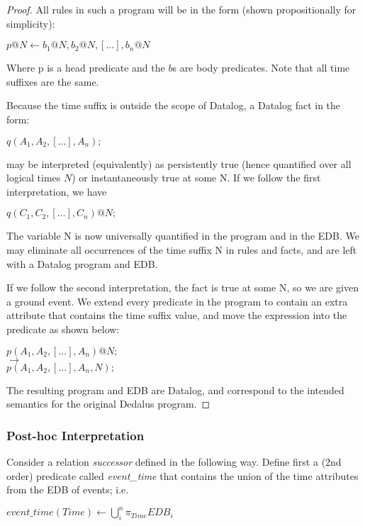 \begin{proof}
All rules in such a program will be in the form (shown propositionally for simplicity): 

$p@N \leftarrow b_{1}@N, b_{2}@N, [...], b_{n}@N$

Where p is a head predicate and the $b$s are body predicates.  Note that all time suffixes are 
the same.

Because the time suffix is outside the scope of Datalog, a Datalog fact in the form:

$q(A_{1}, A_{2}, [...], A_{n});$

may be interpreted (equivalently) as persistently true (hence quantified over all logical times $N$) or instantaneously
true at some N.  If we follow the first interpretation, we have 

$q(C_{1}, C_{2}, [...], C_{n})@N;$

The variable N is now universally quantified in the program and in the EDB.  We may eliminate all occurrences of the time suffix N
in rules and facts, and are left with a Datalog program and EDB.

If we follow the second interpretation, the fact is true at some N, so we are given a ground event.  We extend every predicate in 
the program to contain an extra attribute that contains the time suffix value, and move the expression into the predicate as shown below:

$p(A_{1}, A_{2}, [...], A_{n})@N;$\\
$\rightarrow$\\
$p(A_{1}, A_{2}, [...], A_{n}, N);$

The resulting program and EDB are Datalog, and correspond to the intended semantics for the original Dedalus program.

\end{proof}


\subsubsection{Post-hoc Interpretation}

Consider a relation \emph{successor} defined in the following way.
Define first a (2nd order) predicate called \emph{event\_time} 
that contains the union of the time attributes from the EDB of events; i.e.

$event\_time(Time) \leftarrow \displaystyle\bigcup_{i}^n \pi_{Time}EDB_{i}$

